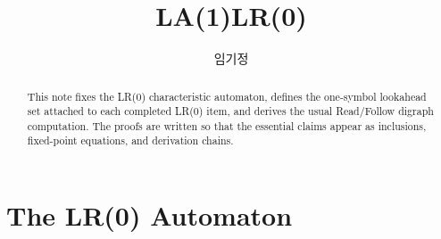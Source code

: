 \documentclass[11pt,a4paper]{article}
\title{\vspace{-2.5em}\sffamily\bfseries LA(1)LR(0)}
\author{임기정}
\date{}
\theoremstyle{prettyplain}
\theoremstyle{prettydef}
\begin{document}
\maketitle

\begin{abstract}
\noindent
This note fixes the LR(0) characteristic automaton, defines the one-symbol
lookahead set attached to each completed LR(0) item, and derives the usual
Read/Follow digraph computation.  The proofs are written so that the essential
claims appear as inclusions, fixed-point equations, and derivation chains.
\end{abstract}

\begingroup
\hypersetup{linkcolor=black}
\tableofcontents
\endgroup
\newpage

\section{The LR(0) Automaton}
\end{document}

